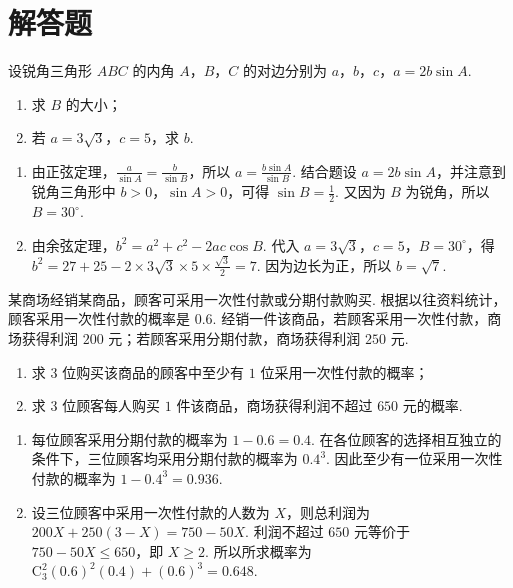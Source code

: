 \section{解答题}

\begin{problem}
设锐角三角形 \(ABC\) 的内角 \(A\)，\(B\)，\(C\) 的对边分别为 \(a\)，\(b\)，\(c\)，\(a = 2b\sin A\).

\begin{enumerate}
\item 求 \(B\) 的大小；
\item 若 \(a = 3\sqrt{3}\)，\(c = 5\)，求 \(b\).
\end{enumerate}
\end{problem}

\begin{solution}
\begin{enumerate}
\item 由正弦定理，\(\frac{a}{\sin A}=\frac{b}{\sin B}\)，所以
\(a=\frac{b\sin A}{\sin B}\). 结合题设 \(a=2b\sin A\)，并注意到锐角三角形中 \(b>0\)，\(\sin A>0\)，可得
\(\sin B=\frac{1}{2}\). 又因为 \(B\) 为锐角，所以 \(B=30^{\circ}\).
\item 由余弦定理，\(b^2=a^2+c^2-2ac\cos B\). 代入
\(a=3\sqrt{3}\)，\(c=5\)，\(B=30^{\circ}\)，得
\(b^2=27+25-2\times3\sqrt{3}\times5\times\frac{\sqrt{3}}{2}=7\). 因为边长为正，所以 \(b=\sqrt{7}\).
\end{enumerate}
\end{solution}

\begin{problem}
某商场经销某商品，顾客可采用一次性付款或分期付款购买. 根据以往资料统计，顾客采用一次性付款的概率是 \(0.6\). 经销一件该商品，若顾客采用一次性付款，商场获得利润 \(200\text{ 元}\)；若顾客采用分期付款，商场获得利润 \(250\text{ 元}\).

\begin{enumerate}
\item 求 \(3\text{ 位}\)购买该商品的顾客中至少有 \(1\text{ 位}\)采用一次性付款的概率；
\item 求 \(3\text{ 位}\)顾客每人购买 \(1\text{ 件}\)该商品，商场获得利润不超过 \(650\text{ 元}\)的概率.
\end{enumerate}
\end{problem}

\begin{solution}
\begin{enumerate}
\item 每位顾客采用分期付款的概率为 \(1-0.6=0.4\). 在各位顾客的选择相互独立的条件下，三位顾客均采用分期付款的概率为 \(0.4^3\). 因此至少有一位采用一次性付款的概率为
\(1-0.4^3=0.936\).
\item 设三位顾客中采用一次性付款的人数为 \(X\)，则总利润为
\(200X+250(3-X)=750-50X\). 利润不超过 \(650\) 元等价于
\(750-50X\leqslant650\)，即 \(X\geqslant2\). 所以所求概率为
\(\mathrm C_3^2(0.6)^2(0.4)+(0.6)^3=0.648\).
\end{enumerate}
\end{solution}

